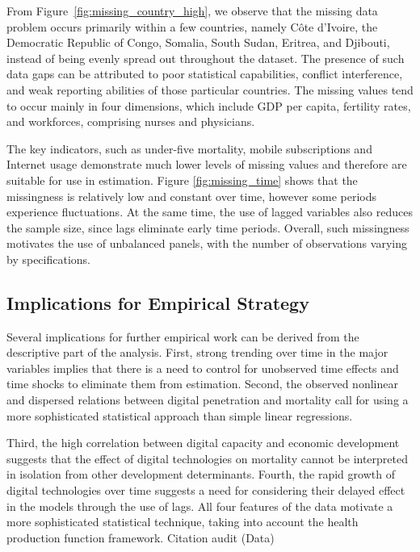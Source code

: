 \documentclass[12pt]{article}
\begin{document}
\medskip
From Figure~\ref{fig:missing_country_high}, we observe that the missing data problem occurs primarily within a few countries, namely Côte d'Ivoire, the Democratic Republic of Congo, Somalia, South Sudan, Eritrea, and Djibouti, instead of being evenly spread out throughout the dataset. The presence of such data gaps can be attributed to poor statistical capabilities, conflict interference, and weak reporting abilities of those particular countries. The missing values tend to occur mainly in four dimensions, which include GDP per capita, fertility rates, and workforces, comprising nurses and physicians.

\medskip
The key indicators, such as under-five mortality, mobile subscriptions and Internet usage demonstrate much lower levels of missing values and therefore are suitable for use in estimation. Figure \ref{fig:missing_time} shows that the missingness is relatively low and constant over time, however some periods experience fluctuations. At the same time, the use of lagged variables also reduces the sample size, since lags eliminate early time periods. Overall, such missingness motivates the use of unbalanced panels, with the number of observations varying by specifications.

\subsection{Implications for Empirical Strategy}

Several implications for further empirical work can be derived from the descriptive part of the analysis. First, strong trending over time in the major variables implies that there is a need to control for unobserved time effects and time shocks to eliminate them from estimation. Second, the observed nonlinear and dispersed relations between digital penetration and mortality call for using a more sophisticated statistical approach than simple linear regressions. 

\medskip
Third, the high correlation between digital capacity and economic development suggests that the effect of digital technologies on mortality cannot be interpreted in isolation from other development determinants. Fourth, the rapid growth of digital technologies over time suggests a need for considering their delayed effect in the models through the use of lags. All four features of the data motivate a more sophisticated statistical technique, taking into account the health production function framework.
Citation audit (Data)
\end{document}
